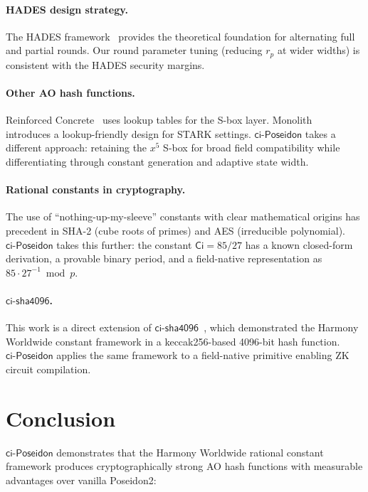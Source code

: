 \documentclass[preprint]{iacrtrans}
\newcommand{\Ci}{\ensuremath{\mathsf{Ci}}}
\newcommand{\ciposeidon}{\ensuremath{\mathsf{ci\text{-}Poseidon}}}
\newcommand{\cisha}{\ensuremath{\mathsf{ci\text{-}sha4096}}}
\begin{document}
\paragraph{HADES design strategy.}
The HADES framework~\cite{GLRRS20} provides the theoretical foundation for
alternating full and partial rounds. Our round parameter tuning (reducing
$r_p$ at wider widths) is consistent with the HADES security margins.

\paragraph{Other AO hash functions.}
Reinforced Concrete~\cite{GLRT22} uses lookup tables for the S-box layer.
Monolith~\cite{LSSS23} introduces a lookup-friendly design for STARK
settings. \ciposeidon{} takes a different approach: retaining the $x^5$
S-box for broad field compatibility while differentiating through constant
generation and adaptive state width.

\paragraph{Rational constants in cryptography.}
The use of ``nothing-up-my-sleeve'' constants with clear mathematical origins
has precedent in SHA-2 (cube roots of primes) and AES (irreducible
polynomial). \ciposeidon{} takes this further: the constant $\Ci = 85/27$
has a known closed-form derivation, a provable binary period, and a
field-native representation as $85 \cdot 27^{-1} \bmod p$.

\paragraph{\cisha{}.}
This work is a direct extension of \cisha{}~\cite{See26}, which demonstrated
the Harmony Worldwide constant framework in a keccak256-based 4096-bit hash
function. \ciposeidon{} applies the same framework to a field-native
primitive enabling ZK circuit compilation.

\section{Conclusion}

\ciposeidon{} demonstrates that the Harmony Worldwide rational constant
framework produces cryptographically strong AO hash functions with measurable
advantages over vanilla Poseidon2:
\end{document}
